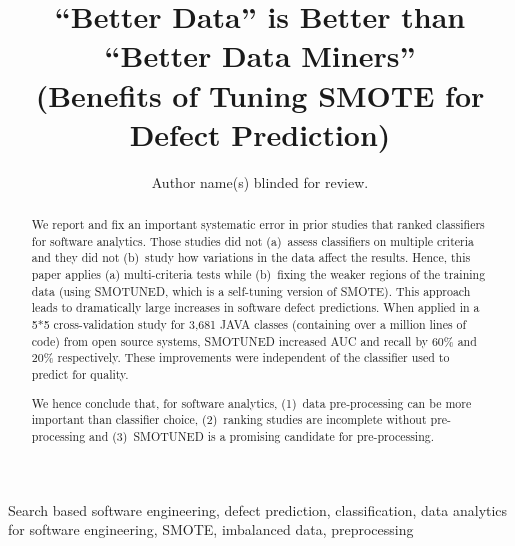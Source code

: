 \documentclass[10pt,conference]{IEEEtran}
\theoremstyle{break}
\theoremstyle{break}
\newcommand{\sma}{{\sc SMOTE}}
\newcommand{\smb}{{\sc SMOTUNED}}
\begin{document}
\pagestyle{plain}

\title{``Better Data'' is Better than ``Better Data Miners''\\ (Benefits of Tuning SMOTE for Defect Prediction) }



\author{Author name(s) blinded for review.}


\maketitle

\begin{abstract}
We report and fix an important systematic error in prior
studies that ranked classifiers for software analytics.
Those studies  did  not (a)~assess classifiers on multiple   criteria
and they did not 
(b)~study  how variations in the  data affect the results. 
Hence, 
this paper applies (a)  multi-criteria tests while (b)~fixing the weaker regions of the training
 data (using {\smb}, which is a self-tuning version of {\sma}).
This approach
leads to dramatically large increases in software defect predictions.
When applied in a 5*5 cross-validation study for  3,681	JAVA classes (containing over a million lines of code) from open source  systems,
{\smb} increased
AUC and recall by 60\% and 20\% respectively. 
These improvements were independent of the classifier used to
predict for quality.

We hence conclude that, for  software analytics, (1)~data
pre-processing can be more important than  classifier
choice,
(2)~ranking studies  are  incomplete  without
 pre-processing and
(3)~{\smb} is a   promising candidate for  pre-processing.

\end{abstract}


\begin{IEEEkeywords}
Search based software engineering,
defect prediction, classification, 
data analytics for software engineering, SMOTE,  imbalanced data, preprocessing
\end{IEEEkeywords}
\end{document}
